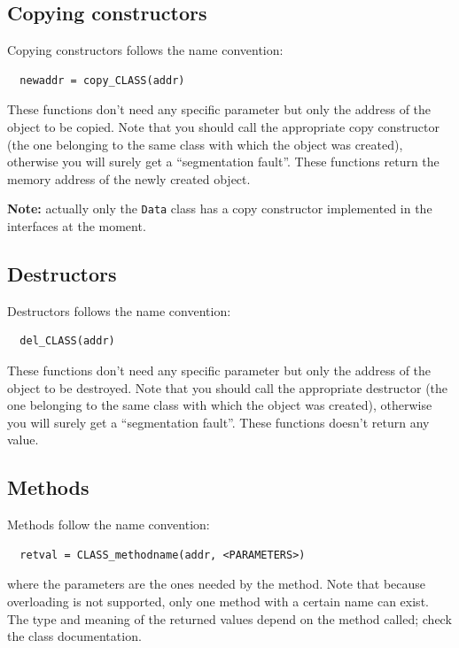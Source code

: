 \documentclass[12pt,titlepage]{article}
\begin{document}
%
\subsection{Copying constructors}
Copying constructors follows the name convention:
%
\begin{verbatim}
  newaddr = copy_CLASS(addr)
\end{verbatim}
%
These functions don't need any specific parameter but only the address
of the object to be copied. Note that you should call the appropriate
copy constructor (the one belonging to the same class with which the
object was created), otherwise you will surely get a ``segmentation
fault''. These functions return the memory address of the newly created
object.

\begin{framed}
\textbf{Note:} actually only the \verb|Data| class has a copy
constructor implemented in the interfaces at the moment.
\end{framed}

%
\subsection{Destructors}
\label{ssec-Destructors}
Destructors follows the name convention:
%
\begin{verbatim}
  del_CLASS(addr)
\end{verbatim}
%
These functions don't need any specific parameter but only the address
of the object to be destroyed. Note that you should call the
appropriate destructor (the one belonging to the same class with which
the object was created), otherwise you will surely get a ``segmentation
fault''. These functions doesn't return any value.

%
\subsection{Methods}
\label{ssec-Methods}
Methods follow the name convention:
%
\begin{verbatim}
  retval = CLASS_methodname(addr, <PARAMETERS>)
\end{verbatim}
%
where the parameters are the ones needed by the method. Note that
because overloading is not supported, only one method with a certain
name can exist. The type and meaning of the returned values depend on
the method called; check the class documentation.
\end{document}
